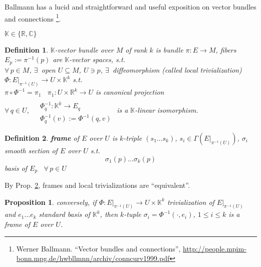 \documentclass[10pt]{amsart}
\newtheorem{proposition}{Proposition}
\newtheorem{definition}{Definition}
\begin{document}
\begin{multicols*}{2}
Ballmann has a lucid and straightforward and useful exposition on vector bundles and connections \cite{WBallmann2002}   \footnote{Werner Ballmann. ``Vector bundles and connections'', \url{http://people.mpim-bonn.mpg.de/hwbllmnn/archiv/conncurv1999.pdf}}.  

  $\mathbb{K} \in \lbrace \mathbb{R},\mathbb{C} \rbrace$
\begin{definition}
$\mathbb{K}$-vector bundle over $M$ of rank $k$ is bundle $\pi:E \to M$, fibers $E_p := \pi^{-1}(p)$ are $\mathbb{K}$-vector spaces, s.t. \\
$\forall \, p \in M$, $\exists \, $ open $U \subseteq M$, $U \ni p$, $\exists \, $ diffeomorphism (called local trivialization) $\Phi: \left. E \right|_{\pi^{-1}(U) } \to U\times \mathbb{K}^k$ s.t. \\
\phantom{ \quad \, } $\pi \circ \Phi^{-1} = \pi_1$ \quad \, $\pi_1 : U \times \mathbb{R}^k \to U$ is canonical projection \\

\phantom{ \quad \, } $\forall \, q \in U$, $\begin{aligned} & \quad \\
  & \Phi_q^{-1}: \mathbb{K}^k \to E_q \\
  & \Phi_q^{-1}(v) := \Phi^{-1}(q,v) \end{aligned}$ is a $\mathbb{K}$-linear isomorphism.
\end{definition}








\begin{definition}\label{Prop:frametrivializequiv}
  \textbf{frame} of $E$ over $U$ is $k$-triple $(s_1 \dots s_k)$, $s_i \in \Gamma(\left. E \right|_{\pi^{-1}(U)} )$, $\sigma_i$ smooth section of $E$ over $U$ s.t. 
\[
\sigma_1(p) \dots \sigma_k(p)
\]
basis of $E_p$ \, $\forall \, p \in U$
\end{definition}

By Prop. \ref{Prop:frametrivializequiv}, frames and local trivializations are ``equivalent''.  




\begin{proposition}





conversely, if $ \Phi : \left. E \right|_{\pi^{-1}(U)} \to U \times \mathbb{K}^k$ trivialization of $\left. E \right|_{\pi^{-1}(U)}$ and $e_1 \dots e_k$ standard basis of $\mathbb{K}^k$, then $k$-tuple $\sigma_i = \Phi^{-1}(\cdot, e_i)$, $1 \leq i \leq k$ is a frame of $E$ over $U$. 
\end{proposition}





\end{multicols*}
\end{document}
